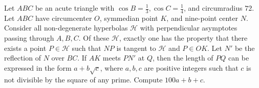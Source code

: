 Let $ABC$ be an acute triangle with $\cos B =\frac{1}{3}, \cos C =\frac{1}{4}$, and circumradius $72$. Let $ABC$ have circumcenter $O$, symmedian point $K$, and nine-point center $N$. Consider all non-degenerate hyperbolas $\mathcal H$ with perpendicular asymptotes passing through $A,B,C$. Of these $\mathcal H$, exactly one has the property that there exists a point $P\in \mathcal H$ such that $NP$ is tangent to $\mathcal H$ and $P\in OK$. Let $N'$ be the reflection of $N$ over $BC$. If $AK$ meets $PN'$ at $Q$, then the length of $PQ$ can be expressed in the form $a+b\sqrt{c}$, where $a,b,c$ are positive integers such that $c$ is not divisible by the square of any prime. Compute $100a+b+c$.
